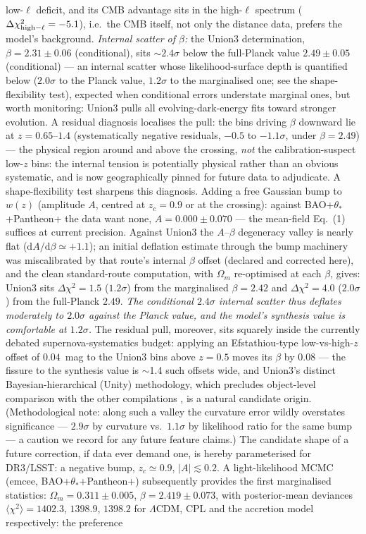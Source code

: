 \documentclass[11pt]{article}
\begin{document}
low-$\ell$ deficit, and its CMB advantage sits in the high-$\ell$ spectrum ($\Delta\chi^2_{\rm high-\ell} = -5.1$), i.e.\ the CMB itself, not only the distance data, prefers the model's background. \emph{Internal scatter of $\beta$:} the Union3 determination, $\beta = 2.31 \pm 0.06$ (conditional), sits $\sim2.4\sigma$ below the full-Planck value $2.49 \pm 0.05$ (conditional) --- an internal scatter whose likelihood-surface depth is quantified below ($2.0\sigma$ to the Planck value, $1.2\sigma$ to the marginalised one; see the shape-flexibility test), expected when conditional errors understate marginal ones, but worth monitoring: Union3 pulls all evolving-dark-energy fits toward stronger evolution. A residual diagnosis localises the pull: the bins driving $\beta$ downward lie at $z = 0.65$--$1.4$ (systematically negative residuals, $-0.5$ to $-1.1\sigma$, under $\beta = 2.49$) --- the physical region around and above the crossing, \emph{not} the calibration-suspect low-$z$ bins: the internal tension is potentially physical rather than an obvious systematic, and is now geographically pinned for future data to adjudicate. A shape-flexibility test sharpens this diagnosis. Adding a free Gaussian bump to $w(z)$ (amplitude $A$, centred at $z_c = 0.9$ or at the crossing): against BAO+$\theta_*$+Pantheon+ the data want none, $A = 0.000 \pm 0.070$ --- the mean-field Eq.~(1) suffices at current precision. Against Union3 the $A$--$\beta$ degeneracy valley is nearly flat ($\mathrm{d}A/\mathrm{d}\beta \simeq +1.1$); an initial deflation estimate through the bump machinery was miscalibrated by that route's internal $\beta$ offset (declared and corrected here), and the clean standard-route computation, with $\Omega_m$ re-optimised at each $\beta$, gives: Union3 sits $\Delta\chi^2 = 1.5$ ($1.2\sigma$) from the marginalised $\beta = 2.42$ and $\Delta\chi^2 = 4.0$ ($2.0\sigma$) from the full-Planck $2.49$. \emph{The conditional $2.4\sigma$ internal scatter thus deflates moderately to $2.0\sigma$ against the Planck value, and the model's synthesis value is comfortable at $1.2\sigma$.} The residual pull, moreover, sits squarely inside the currently debated supernova-systematics budget: applying an Efstathiou-type low-vs-high-$z$ offset of $0.04$~mag \cite{Efstathiou2024} to the Union3 bins above $z=0.5$ moves its $\beta$ by $0.08$ --- the fissure to the synthesis value is $\sim$1.4 such offsets wide, and Union3's distinct Bayesian-hierarchical (Unity) methodology, which precludes object-level comparison with the other compilations \cite{Vincenzi2025}, is a natural candidate origin. (Methodological note: along such a valley the curvature error wildly overstates significance --- $2.9\sigma$ by curvature vs.\ $1.1\sigma$ by likelihood ratio for the same bump --- a caution we record for any future feature claims.) The candidate shape of a future correction, if data ever demand one, is hereby parameterised for DR3/LSST: a negative bump, $z_c \simeq 0.9$, $|A| \lesssim 0.2$. A light-likelihood MCMC (emcee, BAO+$\theta_*$+Pantheon+) subsequently provides the first marginalised statistics: $\Omega_m = 0.311 \pm 0.005$, $\beta = 2.419 \pm 0.073$, with posterior-mean deviances $\langle\chi^2\rangle = 1402.3$, $1398.9$, $1398.2$ for $\Lambda$CDM, CPL and the accretion model respectively: the preference 
\end{document}
